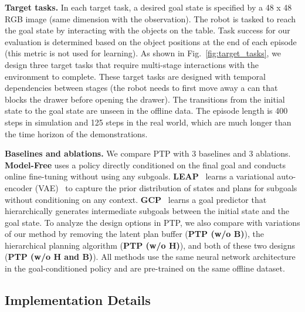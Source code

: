 \textbf{Target tasks.} 
In each target task, a desired goal state is specified by a 48 x 48 RGB image (same dimension with the observation). The robot is tasked to reach the goal state by interacting with the objects on the table. Task success for our evaluation is determined based on the object positions at the end of each episode (this metric is not used for learning). As shown in Fig.~\ref{fig:target_tasks}, we design three target tasks that require multi-stage interactions with the environment to complete. These target tasks are designed with temporal dependencies between stages (\eg the robot needs to first move away a can that blocks the drawer before opening the drawer). The transitions from the initial state to the goal state are unseen in the offline data. The episode length is 400 steps in simulation and 125 steps in the real world, which are much longer than the time horizon of the demonstrations. 

\textbf{Baselines and ablations.} 
We compare PTP with 3 baselines and 3 ablations. \textbf{Model-Free} uses a policy directly conditioned on the final goal and conducts online fine-tuning without using any subgoals. \textbf{LEAP}~\citep{Nasiriany2019PlanningWG} learns a variational auto-encoder (VAE)~\citep{kingma2014vae} to capture the prior distribution of states and plans for subgoals without conditioning on any context. \textbf{GCP}~\citep{Pertsch2020LongHorizonVP} learns a goal predictor that hierarchically generates intermediate subgoals between the initial state and the goal state. To analyze the design options in PTP, we also compare with variations of our method by removing the latent plan buffer (\textbf{PTP (w/o B)}), the hierarchical planning algorithm (\textbf{PTP (w/o H)}), and both of these two designs (\textbf{PTP (w/o H and B)}). All methods use the same neural network architecture in the goal-conditioned policy and are pre-trained on the same offline dataset.

\subsection{Implementation Details}
\label{sec:implementation_details}




